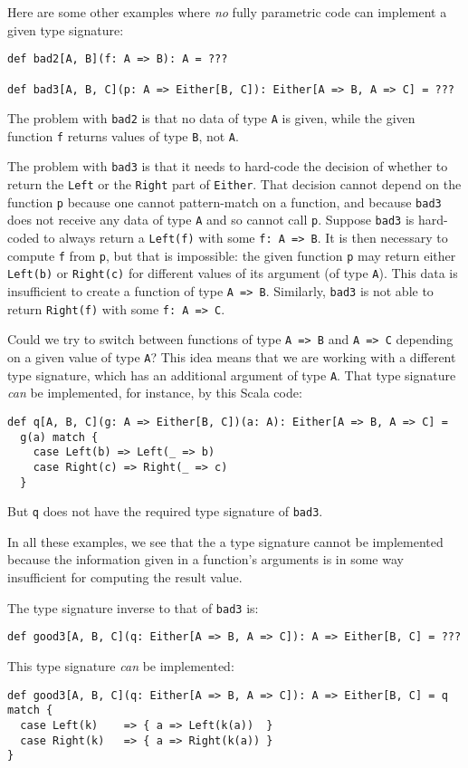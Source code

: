 Here are some other examples where \emph{no} fully parametric code
can implement a given type signature: 
\begin{lstlisting}
def bad2[A, B](f: A => B): A = ???

def bad3[A, B, C](p: A => Either[B, C]): Either[A => B, A => C] = ???
\end{lstlisting}

The problem with \lstinline!bad2! is that no data of type \lstinline!A!
is given, while the given function \lstinline!f! returns values of
type \lstinline!B!, not \lstinline!A!. 

The problem with \lstinline!bad3! is that it needs to hard-code the
decision of whether to return the \lstinline!Left! or the \lstinline!Right!
part of \lstinline!Either!. That decision cannot depend on the function
\lstinline!p! because one cannot pattern-match on a function, and
because \lstinline!bad3! does not receive any data of type \lstinline!A!
and so cannot call \lstinline!p!. Suppose \lstinline!bad3! is hard-coded
to always return a \lstinline!Left(f)! with some \lstinline!f: A => B!.
It is then necessary to compute \lstinline!f! from \lstinline!p!,
but that is impossible: the given function \lstinline!p! may return
either \lstinline!Left(b)! or \lstinline!Right(c)! for different
values of its argument (of type \lstinline!A!). This data is insufficient
to create a function of type \lstinline!A => B!. Similarly, \lstinline!bad3!
is not able to return \lstinline!Right(f)! with some \lstinline!f: A => C!.

Could we try to switch between functions of type \lstinline!A => B!
and \lstinline!A => C! depending on a given value of type \lstinline!A!?
This idea means that we are working with a different type signature,
which has an additional argument of type \lstinline!A!. That type
signature \emph{can} be implemented, for instance, by this Scala code:
\begin{lstlisting}
def q[A, B, C](g: A => Either[B, C])(a: A): Either[A => B, A => C] =
  g(a) match {
    case Left(b) => Left(_ => b)
    case Right(c) => Right(_ => c)
  }
\end{lstlisting}
But \lstinline!q! does not have the required type signature of \lstinline!bad3!.

In all these examples, we see that the a type signature cannot be
implemented because the information given in a function\textsf{'}s arguments
is in some way insufficient for computing the result value.

The type signature inverse to that of \lstinline!bad3! is:
\begin{lstlisting}
def good3[A, B, C](q: Either[A => B, A => C]): A => Either[B, C] = ???
\end{lstlisting}
This type signature \emph{can} be implemented:
\begin{lstlisting}
def good3[A, B, C](q: Either[A => B, A => C]): A => Either[B, C] = q match {
  case Left(k)    => { a => Left(k(a))  }
  case Right(k)   => { a => Right(k(a)) }
}
\end{lstlisting}

